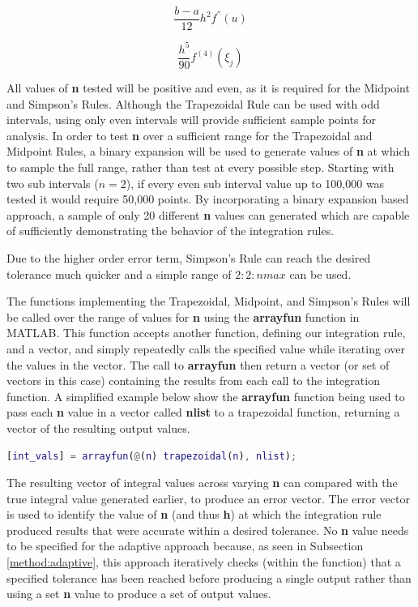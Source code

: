\documentclass[a4paper]{article}
\begin{document}
\begin{equation}
\frac{b-a}{12}h^2f^{''}(u)
\label{mid_err}
\end{equation}

\begin{equation}
\frac{h^5}{90}f^{(4)}(\xi_j)
\label{sim_err}
\end{equation}

All values of \textbf{n} tested will be positive and even, as it is required for the Midpoint and Simpson's Rules. Although the Trapezoidal Rule can be used with odd intervals, using only even intervals will provide sufficient sample points for analysis. In order to test \textbf{n} over a sufficient range for the Trapezoidal and Midpoint Rules, a binary expansion will be used to generate values of \textbf{n} at which to sample the full range, rather than test at every possible step. Starting with two sub intervals ($n=2$), if every even sub interval value up to 100,000 was tested it would require 50,000 points. By incorporating a binary expansion based approach, a sample of only 20 different \textbf{n} values can generated which are capable of sufficiently demonstrating the behavior of the integration rules.

Due to the higher order error term, Simpson's Rule can reach the desired tolerance much quicker and a simple range of $2:2:nmax$ can be used. 

The functions implementing the Trapezoidal, Midpoint, and Simpson's Rules will be called over the range of values for \textbf{n} using the \textbf{arrayfun} function in MATLAB. This function accepts another function, defining our integration rule, and a vector, and simply repeatedly calls the specified value while iterating over the values in the vector. The call to \textbf{arrayfun} then return a vector (or set of vectors in this case) containing the results from each call to the integration function. A simplified example below show the \textbf{arrayfun} function being used to pass each \textbf{n} value in a vector called \textbf{nlist} to a trapezoidal function, returning a vector of the resulting output values.

\bigskip
\begin{lstlisting}[language=Matlab]
[int_vals] = arrayfun(@(n) trapezoidal(n), nlist);
\end{lstlisting}
\bigskip

 The resulting vector of integral values across varying \textbf{n} can compared with the true integral value generated earlier, to produce an error vector. The error vector is used to identify the value of \textbf{n} (and thus \textbf{h}) at which the integration rule produced results that were accurate within a desired tolerance. No \textbf{n} value needs to be specified for the adaptive approach because, as seen in Subsection \ref{method:adaptive}, this approach iteratively checks (within the function) that a specified tolerance has been reached before producing a single output rather than using a set \textbf{n} value to produce a set of output values.
\end{document}
